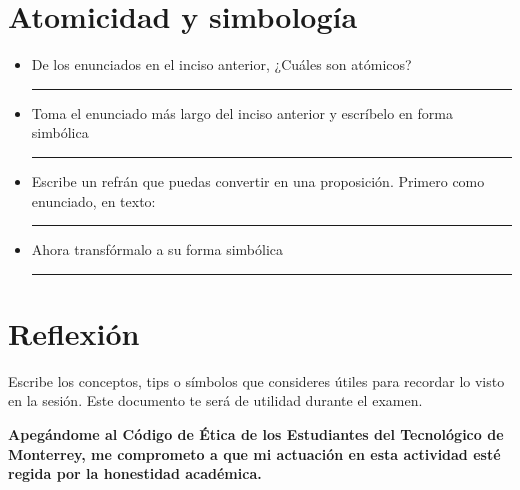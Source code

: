 \documentclass[spanish, 10pt]{article}
\newcommand{\responserule}{{\large\rule{14 cm}{0.3mm}}}
\begin{document}
\section{Atomicidad y simbología}

\begin{itemize}
    \itemsep2.5ex
    \item De los enunciados en el inciso anterior, ¿Cuáles son atómicos? \\[5ex] \responserule
    \item Toma el enunciado más largo del inciso anterior y escríbelo en forma simbólica\\[5ex] \responserule
    \item Escribe un refrán que puedas convertir en una proposición. Primero como enunciado, en texto:\\[5ex] \responserule
    \item Ahora transfórmalo a su forma simbólica \\[5ex] \responserule
\end{itemize}



\section{Reflexión}

Escribe los conceptos, tips o símbolos que consideres útiles para recordar lo visto en la sesión. Este documento te será de utilidad durante el examen.

\vfill

\textbf{Apegándome al Código de Ética de los Estudiantes del Tecnológico de Monterrey, me comprometo a que mi actuación en esta actividad esté regida por la honestidad académica.}
\end{document}
